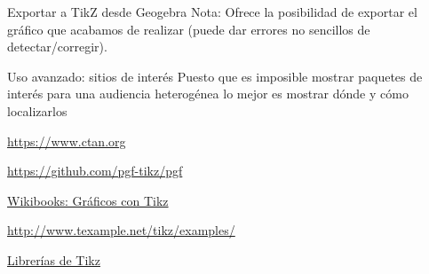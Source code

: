 \documentclass[10pt]{beamer}
\begin{document}
\begin{frame}{Exportar a TikZ desde Geogebra}
Nota: Ofrece la posibilidad de exportar el gr\'afico
que acabamos de realizar (puede dar errores no sencillos de detectar/corregir).
\end{frame}





\begin{frame}[fragile]{Uso avanzado: sitios de interés}
Puesto que es imposible mostrar paquetes de interés para una 
audiencia heterogénea lo mejor es mostrar dónde y cómo localizarlos

\href{https://www.ctan.org}{\color{blue}https://www.ctan.org}

\href{https://github.com/pgf-tikz/pgf}{\color{blue}https://github.com/pgf-tikz/pgf}

\href{https://es.wikibooks.org/wiki/Manual_de_LaTeX/Inclusión_de_gráficos/Gráficos_con_TikZ}{\color{blue}Wikibooks: Gráficos con Tikz}

\href{http://www.texample.net/tikz/examples/}{\color{blue}http://www.texample.net/tikz/examples/}

\href{https://tex.stackexchange.com/questions/42611/list-of-available-tikz-libraries-with-a-short-introduction}{\color{blue} Librerías de Tikz}

\end{frame}
\end{document}
